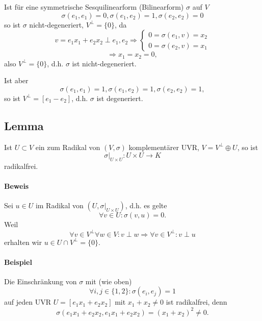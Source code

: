 	Ist für eine symmetrische Sesquilinearform (Bilinearform) $ \sigma $ auf $ V $
		\[ \sigma(e_1,e_1) = 0, \sigma(e_1,e_2) = 1, \sigma(e_2,e_2) = 0 \]
	so ist $ \sigma $ nicht-degeneriert, $ V^\perp = \{0\} $, da
		\[ v = e_1x_1 + e_2x_2 \perp e_1,e_2 \Rightarrow
		\begin{cases}
		0 = \sigma(e_1,v) = x_2\\
		0 = \sigma(e_2,v) = x_1
		\end{cases} \]
		\[ \Rightarrow x_1 = x_2 = 0, \]
	also $ V^\perp = \{0\} $, d.h. $ \sigma $ ist nicht-degeneriert.
	
	
	Ist aber
		\[ \sigma(e_1,e_1) = 1, \sigma(e_1,e_2) = 1, \sigma(e_2,e_2) = 1, \]
	so ist $ V^\perp = [e_1-e_2] $, d.h. $ \sigma $ ist degeneriert.
	

\subsection{Lemma}
\begin{Lemma}[]
	Ist $ U\subset V $ ein zum Radikal von $ (V,\sigma) $ komplementärer UVR, $ V = V^\perp \oplus U $, so ist
		\[ \sigma\big|_{U\times U}:U\times U \to K \]
	radikalfrei.
\end{Lemma}
\paragraph{Beweis}
	Sei $ u\in U $ im Radikal von $ (U,\sigma\big|_{U\times U}) $, d.h. es gelte
		\[ \forall v\in U: \sigma(v,u) = 0. \]
	Weil
		\[ \forall v\in V^\perp\forall w\in V: v\perp w \Rightarrow \forall v\in V^\perp: v\perp u \]
	erhalten wir $ u\in U\cap V^\perp = \{0\} $.
\paragraph{Beispiel}
	Die Einschränkung von $ \sigma $ mit (wie oben)
		\[ \forall i,j \in \{1,2\}: \sigma(e_i,e_j) = 1 \]
		auf jeden UVR $ U = [e_1x_1 + e_2x_2] $ mit $ x_1 + x_2 \neq 0 $ ist radikalfrei, denn
			\[ \sigma(e_1x_1+e_2x_2, e_1x_1+e_2x_2) = (x_1+x_2)^2 \neq 0. \]
	